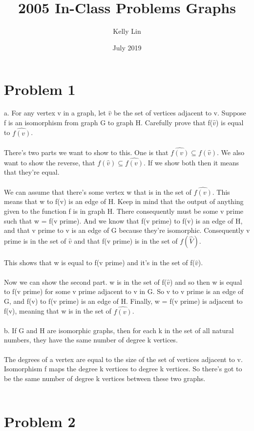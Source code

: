 \documentclass{article}
\title{2005 In-Class Problems Graphs}
\author{Kelly Lin }
\date{July 2019}
\begin{document}
\maketitle

\section{Problem 1}
a. For any vertex v in a graph, let $\hat{v}$ be the set of vertices adjacent to v. Suppose f is an isomorphism from graph G to graph H. Carefully prove that f($\hat{v}$) is equal to $\widehat{f(v)}$.
\\\\
There's two parts we want to show to this. One is that $\widehat{f(v)} \subseteq f(\hat{v})$. We also want to show the reverse, that $f(\hat{v}) \subseteq \widehat{f(v)} $. If we show both then it means that they're equal.
\\\\
We can assume that there's some vertex w that is in the set of $\widehat{f(v)}$. This means that w to f(v) is an edge of H. Keep in mind that the output of anything given to the function f is in graph H. There consequently must be some v prime such that w = f(v prime). And we know that f(v prime) to f(v) is an edge of H, and that v prime to v is an edge of G because they're isomorphic. Consequently v prime is in the set of $\hat{v}$ and that f(v prime) is in the set of $f(\hat{V})$. 
\\\\
This shows that w is equal to f(v prime) and it's in the set of f($\hat{v}$).
\\\\
Now we can show the second part. w is in the set of f($\hat{v}$) and so then w is equal to f(v prime) for some v prime adjacent to v in G. So v to v prime is an edge of G, and f(v) to f(v prime) is an edge of H. Finally, w = f(v prime) is adjacent to f(v), meaning that w is in the set of $\widehat{f(v)}$.
\\\\
b. If G and H are isomorphic graphs, then for each k in the set of all natural numbers, they have the same number of degree k vertices. 
\\\\
The degrees of a vertex are equal to the size of the set of vertices adjacent to v. Isomorphism f maps the degree k vertices to degree k vertices. So there's got to be the same number of degree k vertices between these two graphs. 
\\\\
\section{Problem 2}
\end{document}
